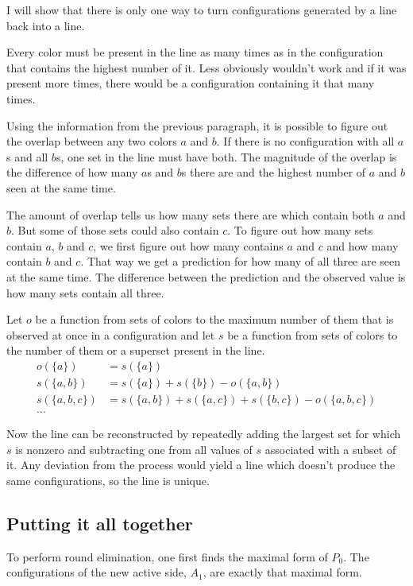 \documentclass[english, 12pt, a4paper, sci, a-1b, online]{aaltothesis}
\begin{document}
I will show that there is only one way to turn configurations generated by a line back into a line.

Every color must be present in the line as many times as in the configuration that contains the highest number of it. Less obviously wouldn't work and if it was present more times, there would be a configuration containing it that many times.

Using the information from the previous paragraph, it is possible to figure out the overlap between any two colors $a$ and $b$. If there is no configuration with all $a$s and all $b$s, one set in the line must have both. The magnitude of the overlap is the difference of how many $a$s and $b$s there are and the highest number of $a$ and $b$ seen at the same time.

The amount of overlap tells us how many sets there are which contain both $a$ and $b$. But some of those sets could also contain $c$. To figure out how many sets contain $a$, $b$ and $c$, we first figure out how many contains $a$ and $c$ and how many contain $b$ and $c$. That way we get a prediction for how many of all three are seen at the same time. The difference between the prediction and the observed value is how many sets contain all three.

Let $o$ be a function from sets of colors to the maximum number of them that is observed at once in a configuration and let $s$ be a function from sets of colors to the number of them or a superset present in the line.
\begin{align*}
  o(\{a\}) &= s(\{a\}) \\
  s(\{a, b\}) &= s(\{a\}) + s(\{b\}) - o(\{a, b\}) \\
  s(\{a, b, c\}) &= s(\{a, b\}) + s(\{a, c\}) + s(\{b, c\}) - o(\{a, b, c\}) \\
  ...
\end{align*}

Now the line can be reconstructed by repeatedly adding the largest set for which $s$ is nonzero and subtracting one from all values of $s$ associated with a subset of it. Any deviation from the process would yield a line which doesn't produce the same configurations, so the line is unique.

\subsection{Putting it all together}

To perform round elimination, one first finds the maximal form of $P_0$. The configurations of the new active side, $A_1$, are exactly that maximal form.
\end{document}
